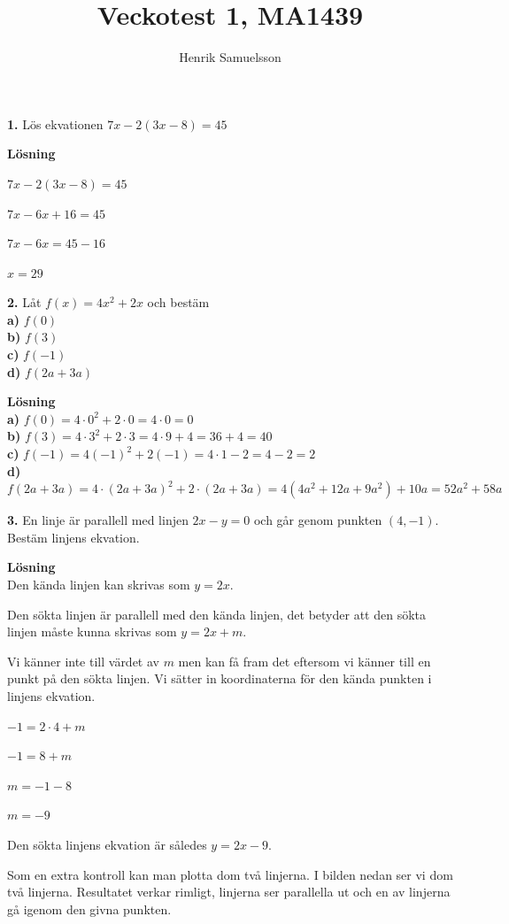 \documentclass{article}
\begin{document}
\title{Veckotest 1, MA1439}
\author{Henrik Samuelsson}
\maketitle
\textbf{1.} Lös ekvationen $7x-2(3x-8)=45$

\textbf{Lösning}

$7x-2(3x-8)=45$

$7x-6x+16=45$

$7x-6x=45-16$

$x=29$

\textbf{2.} Låt $f(x)=4x^{2}+2x$ och bestäm\\
\textbf{a)} $f(0)$\\
\textbf{b)} $f(3)$\\
\textbf{c)} $f(-1)$\\
\textbf{d)} $f(2a + 3a)$

\textbf{Lösning}\\
\textbf{a)} $f(0)=4\cdot0^2+2\cdot0=4\cdot0=0$\\
\textbf{b)} $f(3)=4\cdot3^2+2\cdot3=4\cdot9+4=36+4=40$\\
\textbf{c)} $f(-1)=4(-1)^2+2(-1)=4\cdot1-2=4-2=2$\\
\textbf{d)} $f(2a+3a)=4\cdot(2a+3a)^2+2\cdot(2a+3a)=4(4a^2+12a+9a^2)+10a=52a^2+58a$

\textbf{3.} En linje är parallell med linjen $2x - y = 0$ och går genom punkten $(4, -1)$. Bestäm linjens ekvation.

\textbf{Lösning}\\
Den kända linjen kan skrivas som $y = 2x$.

Den sökta linjen är parallell med den kända linjen, det betyder att den sökta linjen måste kunna skrivas som $y = 2x + m$.

Vi känner inte till värdet av $m$ men kan få fram det eftersom vi känner till en punkt på den sökta linjen. Vi sätter in koordinaterna för den kända punkten i linjens ekvation.

$-1 = 2 \cdot 4 + m$

$-1 = 8 + m$

$m = -1 - 8$

$m = -9$

Den sökta linjens ekvation är således $y = 2x - 9$.

Som en extra kontroll kan man plotta dom två linjerna. I bilden nedan ser vi dom två linjerna. Resultatet verkar rimligt, linjerna ser parallella ut och en av linjerna gå igenom den givna punkten. 
\end{document}
